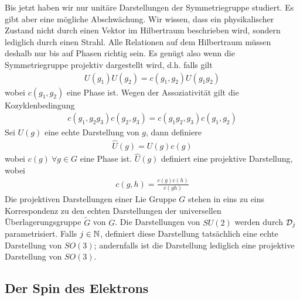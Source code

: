 Bis jetzt haben wir nur unitäre Darstellungen der Symmetriegruppe studiert.
Es gibt aber eine mögliche Abschwächung. Wir wissen, dass ein physikalischer
Zustand nicht durch einen Vektor im Hilbertraum beschrieben wird, sondern lediglich
durch einen Strahl. Alle Relationen auf dem Hilbertraum müssen deshalb nur bis auf
Phasen richtig sein. Es genügt also wenn die Symmetriegruppe projektiv dargestellt
wird, d.h. falls gilt
\begin{align*}
    U(g_1) U(g_2) = c(g_1,g_2)U(g_1 g_2)
\end{align*}
wobei $c(g_1 , g_2)$ eine Phase ist. Wegen der Assoziativität gilt die
Kozyklenbedingung
\begin{align*}
    c(g_1 , g_2 g_3) c(g_2 , g_3) = c(g_1 g_2 , g_3) c(g_1 , g_2)
\end{align*}
Sei $U(g)$ eine echte Darstellung von $g$, dann definiere
\begin{align*}
    \hat{U}(g) = U(g) c(g)
\end{align*}
wobei $c(g) \ \forall g \in G$ eine Phase ist. $\hat{U} (g)$ definiert eine
projektive Darstellung, wobei
\begin{align*}
    c(g,h) = \frac{c(g) c(h)}{c(g h)}
\end{align*}
Die projektiven Darstellungen einer Lie Gruppe $G$ stehen in eins zu eins
Korrespondenz zu den echten Darstellungen der universellen Überlagerungsgruppe
$\tilde{G}$ von $G$. Die Darstellungen von $SU(2)$ werden durch $\mathcal{D}_j$ parametrisiert.
Falls $j \in \mathbb{N}$, definiert diese Darstellung tatsächlich eine echte Darstellung von
$SO(3)$; andernfalls ist die Darstellung lediglich eine projektive Darstellung
von $SO(3)$.

\subsection{Der Spin des Elektrons}

